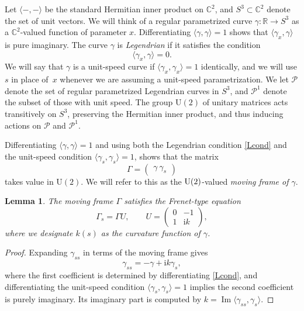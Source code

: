 \documentclass[pdftex]{sigma}
\newcommand\Leg{ {\mathcal P}} %
\newcommand\Legu{ {\mathcal P}^1} %
\newcommand\kk{k} %
\def\ri{\mathrm{i}}
\def\gam{\gamma} %
\def\C{\mathbb C}
\def\R{\mathbb R}
\newcommand\rU{\mathrm U}
\renewcommand\Im{\operatorname{Im}}
\numberwithin{equation}{section}
\newtheorem{Lemma}[Theorem]{Lemma}
\begin{document}
Let $\langle -,-\rangle$ be the standard Hermitian inner product on $\C^2$, and $S^3 \subset \C^2$ denote the set of unit vectors.
 We will think of a regular parametrized curve $\gam\colon \R \to S^3$
as a $\C^2$-valued function of parameter $x$.
Differentiating $\langle \gam, \gam\rangle=1$ shows that $\langle \gam_x, \gam\rangle$ is pure imaginary. The curve $\gam$ is {\it Legendrian} if it satisfies the condition
\begin{equation}\label{Lcond}
\langle \gam_x, \gam \rangle=0.
\end{equation}
We will say that $\gam$ is a unit-speed curve if $\langle \gam_x, \gam_x \rangle =1$ identically, and we will use $s$ in place of~$x$ whenever we are assuming a unit-speed parametrization. We let $\Leg$ denote the set of regular parametrized Legendrian curves in $S^3$, and $\Legu$ denote the subset of those with unit speed.
The group $\rU(2)$ of unitary matrices acts transitively on $S^3$,
preserving the Hermitian inner product,
and thus inducing actions on $\Leg$ and $\Legu$.

Differentiating $\langle \gam, \gam \rangle=1$ and using both the Legendrian condition \eqref{Lcond} and the unit-speed condition
$\langle \gam_s, \gam_s \rangle=1$, shows that the matrix
\[
\Gamma = \begin{pmatrix} \gam \ \gam_s \end{pmatrix}
\]
takes value in $\rU(2)$. We will refer to this as the ${\rm U}(2)$-valued {\it moving frame of $\gam$}.
\begin{Lemma}
The moving frame $\Gamma$ satisfies the Frenet-type equation
\begin{equation}\label{FrenetEquation}
\Gamma_s = \Gamma U, \qquad U = \begin{pmatrix} 0 & -1 \\ 1 & \ri \kk\end{pmatrix},
\end{equation}
where we designate $\kk(s)$ as the {\it curvature function} of $\gam$.
\end{Lemma}
\begin{proof}
Expanding $\gam_{ss}$ in terms of the moving frame gives
\begin{equation}\label{gamss}
\gam_{ss} = -\gam + \ri \kk \gam_s,
\end{equation}
where the first coefficient is determined by differentiating \eqref{Lcond}, and differentiating the unit-speed condition $\langle \gam_s, \gam_s \rangle=1$
implies the second coefficient is purely imaginary. Its imaginary part is computed by $\kk= \Im \langle \gam_{ss}, \gam_s \rangle$.
\end{proof}
\end{document}
